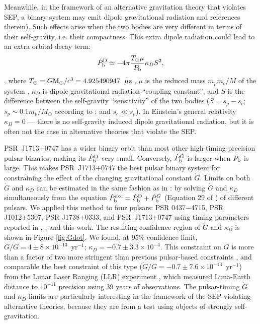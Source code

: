 Meanwhile, in the framework of an alternative gravitation theory that violates
SEP, a binary system may emit dipole gravitational radiation \citealt{Will93, Will01, lwj+09, fwe+12} and references
therein). Such effects arise when the two bodies are very different in terms
of their self-gravity, i.e.  their compactness.
This extra dipole radiation could lead to an extra orbital decay term:
\begin{equation}
\dot{P}_{\rm b}^{\rm D} \simeq -4\pi\frac{T_{\odot}\mu}{P_{\rm b}}\kappa_D S^2,
\end{equation}
\citep{lwj+09}, where $T_{\odot}=G{\rm M_{\odot}}/c^3=4.925490947$~${\rm
\mu}$s \citep{lk05}, $\mu$ is the reduced mass $m_pm_c/M$ of the system , $\kappa_D $ is dipole
gravitational radiation ``coupling constant'', and $S$ is the difference
between the self-gravity ``sensitivity'' of the two bodies ($S = s_p - s_c$;
$s_p\sim0.1m_p/M_{\odot}$ according to \citealt{de92} ; and $s_c\ll s_p$).
In Einstein's general relativity $\kappa_D=0$ --- there is no self-gravity induced
dipole gravitational radiation, but it is often not the case in alternative
theories that violate the SEP.

PSR~J1713+0747 has a wider binary orbit than most other
high-timing-precision pulsar binaries, making its $\dot{P}_{\rm b}^{\rm D}$
very small. Conversely, $\dot{P}_{\rm b}^{\dot{G}}$ is larger when $P_{\rm b}$
is large. This makes PSR~J1713+0747 the best pulsar binary system for constraining
the effect of the changing gravitational constant $\dot{G}$. Limits 
on both $\dot{G}$ and $\kappa_D$ can be estimated in the same fashion as in
\citet{lwj+09}: by solving $\dot{G}$ and $\kappa_D$ simultaneously 
from the equation $\dot{P}_{\rm b}^{\rm exc} = \dot{P}_{\rm b}^{\rm D} +
\dot{P}_{\rm b}^{\dot{G}}$ (Equation 29 of \citealt{lwj+09}) of different
pulsars. We applied this method to four pulsars: PSR 0437$-$4715, PSR J1012+5307, PSR
J1738+0333, and PSR~J1713+0747 using timing parameters reported in
\citet{lwj+09}, \citet{fwe+12}, and this work.
The resulting confidence region of $\dot{G}$ and $\kappa_D$ is shown in Figure
\ref{fig:Gdot}.
We found, at 95\% confidence limit, $\dot{G}/G =
4\pm8\times10^{-13}$~yr$^{-1}$; $\kappa_D=-0.7\pm3.3\times10^{-4}$. 
This constraint on $\dot{G}$ is more than a factor of two more stringent than
previous pulsar-based constraints \citep{fwe+12}, and comparable
the best constraint of this type
($\dot{G}/G=-0.7\pm7.6\times10^{-13}$~yr$^{-1}$) from the Lunar Laser Ranging
(LLR)
experiment \citep{hmb10}, which measured Luna-Earth distance to $10^{-11}$
precision using 39 years of observations.
The pulsar-timing $\dot{G}$ and $\kappa_D$ limits are particularly interesting 
in the framework of the SEP-violating alternative theories, because they are from 
a test using objects of strongly self-gravitation.


